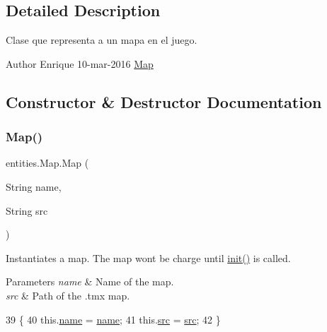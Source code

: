 \subsection{Detailed Description}
Clase que representa a un mapa en el juego.

\begin{DoxyAuthor}{Author}
Enrique  10-\/mar-\/2016  \mbox{\hyperlink{classentities_1_1_map}{Map}} 
\end{DoxyAuthor}


\subsection{Constructor \& Destructor Documentation}
\mbox{\label{classentities_1_1_map_af46803f47cfa8c8714c5a7970fb5c334}} 
\subsubsection{\texorpdfstring{Map()}{Map()}}
{\footnotesize\ttfamily entities.\+Map.\+Map (\begin{DoxyParamCaption}\item[{String}]{name,  }\item[{String}]{src }\end{DoxyParamCaption})\hspace{0.3cm}{\ttfamily [inline]}}

Instantiates a map. The map won\textquotesingle{}t be charge until \mbox{\hyperlink{classentities_1_1_map_a183d1b160c442fc50c37cf0cb956f5cd}{init()}} is called.


\begin{DoxyParams}{Parameters}
{\em name} & Name of the map. \\
\hline
{\em src} & Path of the .tmx map. \\
\hline
\end{DoxyParams}

\begin{DoxyCode}
39                                         \{
40         this.\mbox{\hyperlink{classentities_1_1_map_a969750cbb3acef375d33040e29be91f0}{name}} = \mbox{\hyperlink{classentities_1_1_map_a969750cbb3acef375d33040e29be91f0}{name}};
41         this.\mbox{\hyperlink{classentities_1_1_map_a15025d8ae6bb3627fb145ce75013b011}{src}} = \mbox{\hyperlink{classentities_1_1_map_a15025d8ae6bb3627fb145ce75013b011}{src}};
42     \}
\end{DoxyCode}


